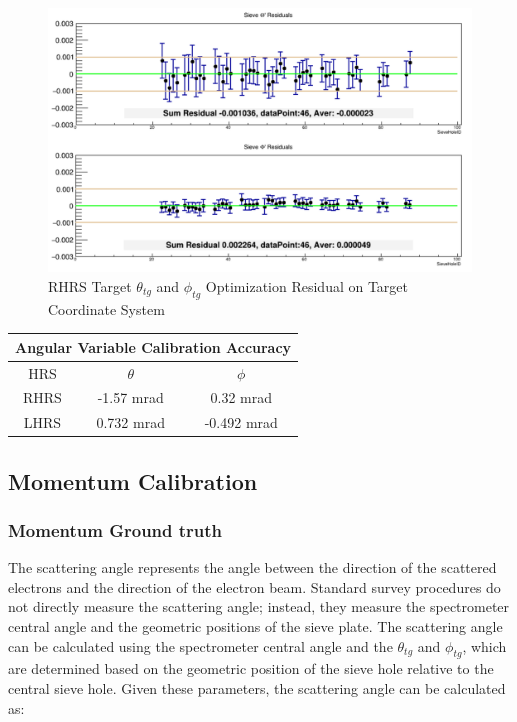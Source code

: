 \begin{figure}[h]
    \centering
    \includegraphics[width =\textwidth]{images/chap4/rhrs_residual_theta_phi.png}
    \caption{RHRS Target $\theta_{tg}$ and $\phi_{tg}$ Optimization Residual on Target Coordinate System}
    \label{fig:rhrs_tg_theta_phi_residual}
\end{figure}

\begin{center}
    \begin{tabular}{|c || c | c|}
        \hline
        \multicolumn{3}{|c|}{Angular Variable Calibration Accuracy} \\
        \hline
            HRS & $\theta$ & $\phi$ \\
        \hline
            RHRS & -1.57 mrad & 0.32 mrad \\
        \hline
            LHRS & 0.732 mrad & -0.492 mrad \\
            \hline
    \end{tabular}
\end{center}

\subsection{Momentum Calibration}
\subsubsection{Momentum Ground truth}

The scattering angle represents the angle between the direction of the scattered electrons and the direction of the electron beam. Standard survey procedures do not directly measure the scattering angle; instead, they measure the spectrometer central angle and the geometric positions of the sieve plate. The scattering angle can be calculated using the spectrometer central angle and the $\theta_{tg}$ and $\phi_{tg}$, which are determined based on the geometric position of the sieve hole relative to the central sieve hole. Given these parameters, the scattering angle can be calculated as:

